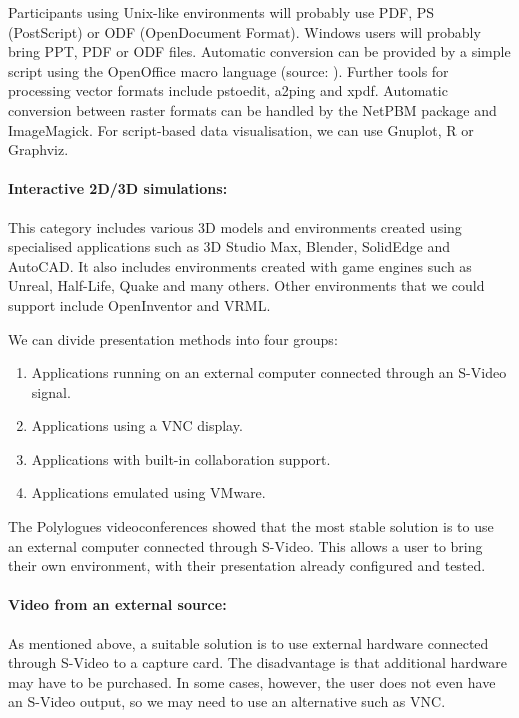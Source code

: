 Participants using Unix-like environments will probably use PDF, PS (PostScript) or ODF (OpenDocument Format). Windows users will probably bring PPT, PDF or ODF files. Automatic conversion can be provided by a simple script using the OpenOffice macro language (source: \cite{OpenOffice-Conversion}). Further tools for processing vector formats include pstoedit, a2ping and xpdf. Automatic conversion between raster formats can be handled by the NetPBM package and ImageMagick. For script-based data visualisation, we can use Gnuplot, R or Graphviz.

\paragraph*{Interactive 2D/3D simulations:}
This category includes various 3D models and environments created using specialised applications such as 3D Studio Max, Blender, SolidEdge and AutoCAD. It also includes environments created with game engines such as Unreal, Half-Life, Quake and many others. Other environments that we could support include OpenInventor and VRML.

\begin{samepage}
\noindent
We can divide presentation methods into four groups:
\begin{enumerate}
\item Applications running on an external computer connected through an S-Video signal.
\item Applications using a VNC display.
\item Applications with built-in collaboration support.
\item Applications emulated using VMware.
\end{enumerate}
\end{samepage}

\noindent
The Polylogues videoconferences showed that the most stable solution is to use an external computer connected through S-Video. This allows a user to bring their own environment, with their presentation already configured and tested.

\paragraph*{Video from an external source:}
As mentioned above, a suitable solution is to use external hardware connected through S-Video to a capture card. The disadvantage is that additional hardware may have to be purchased. In some cases, however, the user does not even have an S-Video output, so we may need to use an alternative such as VNC.

